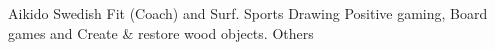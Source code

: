 \begin{cvhonors}
  \cvhonor
    {Aikido}
    {Swedish Fit (Coach) and Surf.}
    {}
    {Sports}
  \cvhonor
    {Drawing}
    {Positive gaming, Board games and Create \& restore wood objects.}
    {}
    {Others}
\end{cvhonors}
